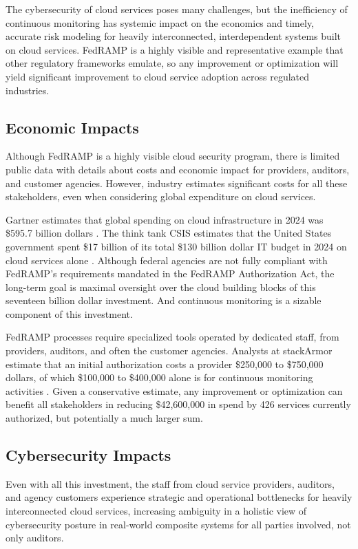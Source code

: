 \documentclass{jdf}
\begin{document}
The cybersecurity of cloud services poses many challenges, but the inefficiency of continuous monitoring has systemic impact on the economics and timely, accurate risk modeling for heavily interconnected, interdependent systems built on cloud services. FedRAMP is a highly visible and representative example that other regulatory frameworks emulate, so any improvement or optimization will yield significant improvement to cloud service adoption across regulated industries.

\subsection{Economic Impacts}

Although FedRAMP is a highly visible cloud security program, there is limited public data with details about costs and economic impact for providers, auditors, and customer agencies. However, industry estimates significant costs for all these stakeholders, even when considering global expenditure on cloud services.

Gartner estimates that global spending on cloud infrastructure in 2024 was \$595.7 billion dollars \citeyear{gartner24}. The think tank CSIS estimates that the United States government spent \$17 billion of its total \$130 billion dollar IT budget in 2024 on cloud services alone \citeyear[p.~1]{csis25}. Although federal agencies are not fully compliant with FedRAMP's requirements mandated in the FedRAMP Authorization Act, the long-term goal is maximal oversight over the cloud building blocks of this seventeen billion dollar investment. And continuous monitoring is a sizable component of this investment.

FedRAMP processes require specialized tools operated by dedicated staff, from providers, auditors, and often the customer agencies. Analysts at stackArmor estimate that an initial authorization costs a provider \$250,000 to \$750,000 dollars, of which \$100,000 to \$400,000 alone is for continuous monitoring activities \citeyear{stackarmor24}. Given a conservative estimate, any improvement or optimization can benefit all stakeholders in reducing \$42,600,000 in spend by 426 services currently authorized, but potentially a much larger sum.

\subsection{Cybersecurity Impacts}

Even with all this investment, the staff from cloud service providers, auditors, and agency customers experience strategic and operational bottlenecks for heavily interconnected cloud services, increasing ambiguity in a holistic view of cybersecurity posture in real-world composite systems for all parties involved, not only auditors. 
\end{document}
